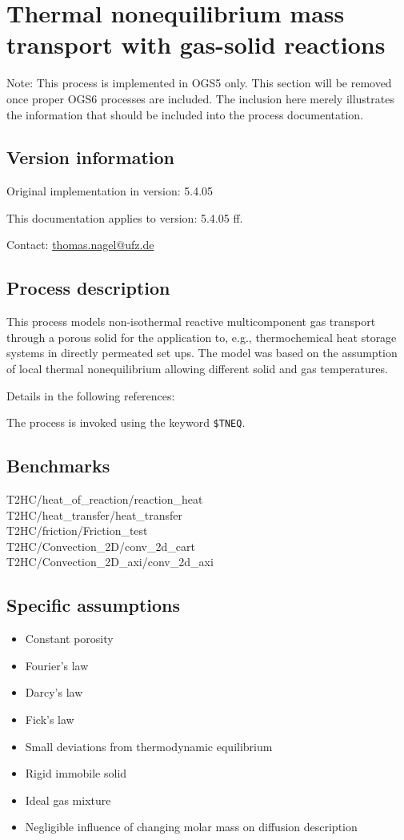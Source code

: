 \section{Thermal nonequilibrium mass transport with gas-solid reactions}
Note: This process is implemented in OGS5 only. This section will be removed once proper OGS6 processes are included. The inclusion here merely illustrates the information that should be included into the process documentation.

\subsection{Version information}
Original implementation in version: 5.4.05

This documentation applies to version: 5.4.05 ff.

Contact: \url{thomas.nagel@ufz.de}

\subsection{Process description}
This process models non-isothermal reactive multicomponent gas transport through a porous solid for the application to, e.g., thermochemical heat storage systems in directly permeated set ups. The model was based on the assumption of local thermal nonequilibrium allowing different solid and gas temperatures.

Details in the following references: \cite{Nagel2013,Shao2013}

The process is invoked using the keyword \texttt{\$TNEQ}.

\subsection{Benchmarks}
T2HC/heat\_of\_reaction/reaction\_heat\\
T2HC/heat\_transfer/heat\_transfer\\
T2HC/friction/Friction\_test\\
T2HC/Convection\_2D/conv\_2d\_cart\\
T2HC/Convection\_2D\_axi/conv\_2d\_axi

\subsection{Specific assumptions}
\begin{itemize}
	\item Constant porosity
	\item Fourier's law
	\item Darcy's law
	\item Fick's law
	\item Small deviations from thermodynamic equilibrium
	\item Rigid immobile solid
	\item Ideal gas mixture
	\item Negligible influence of changing molar mass on diffusion description
\end{itemize}

